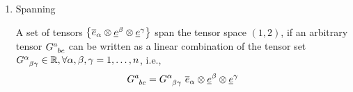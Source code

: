 \begin{solution_pset}
\begin{enumerate}[(1)]
				\begin{proof}
					Consider $C\indices{^\alpha_{\beta\gamma}}\in\R$ such that
					\[
						C\indices{^\alpha_{\beta\gamma}}\ 
						\ovr e_\alpha \otimes \und e^\beta \otimes \und e^\gamma
						=
						0\indices{^{a}_{bc}}.
					\]
					Let's feed the tensor a set of basis covectors and vectors,
					$\und e^\lambda,\ovr e_\mu,\ovr e_\nu$.
					Then
					\begin{align*}
						C\indices{^\alpha_{\beta\gamma}}\ 
						\ovr e_\alpha \otimes \und e^\beta \otimes \und e^\gamma
						[
							\und e^\lambda,
							\ovr e_\mu,
							\ovr e_\nu
						]
						&=
						0\indices{^{a}_{bc}}
						[
							\und e^\lambda,
							\ovr e_\mu,
							\ovr e_\nu
						]
						\\
						C\indices{^\alpha_{\beta\gamma}}\ 
						\ovr e_\alpha[\und e^\lambda]
						\und e^\beta[\ovr e_\mu]
						\und e^\gamma[\ovr e_\nu]
						&=0
						\\
						C\indices{^\alpha_{\beta\gamma}}
						\delta\indices{^\lambda_\alpha}
						\delta\indices{^\beta_\mu}
						\delta\indices{^\gamma_\nu}
						&=0
						\\
						C\indices{^\lambda_{\beta\gamma}}
						\delta\indices{^\beta_\mu}
						\delta\indices{^\gamma_\nu}
						&=0
						\\
						C\indices{^\lambda_{\mu\gamma}}
						\delta\indices{^\gamma_\nu}
						&=0
						\\
						C\indices{^\lambda_{\mu\nu}}
						&=0.
					\end{align*}
					Since the indices $\lambda,\mu,\nu$ are arbitrary, we can replace them. Hence,
					\[
						C\indices{^\alpha_{\beta\gamma}}=0
					\]
					for all $\alpha,\beta,\gamma$.
				\end{proof}
				
				
			\item Spanning

				A set of tensors $
					\qty{
						\overline{e}_\alpha \otimes \underline{e}^\beta \otimes \underline{e}^\gamma
					}
				$ span the tensor space $(1,2)$,
				if an arbitrary tensor $G\indices{^{a}_{bc}}$ can be written as a linear
				combination of the tensor set $G\indices{^\alpha_{\beta\gamma}}\in \R, \forall \alpha,\beta,\gamma = 1,\ldots,n$, i.e.,
				\[
					G\indices{^{a}_{bc}}
					 = 
					 G\indices{^{\alpha}_{\beta\gamma}}\ 
					\ovr e_\alpha \otimes \und e^\beta \otimes \und e^\gamma
				\]


\end{enumerate}
\end{solution_pset}

